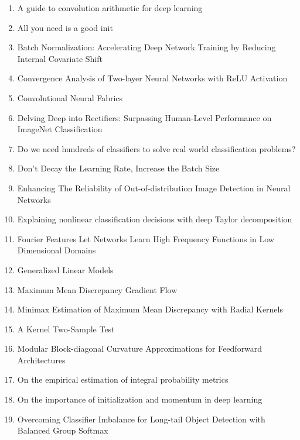 \documentclass[acmlarge]{acmart}
\begin{document}
\begin{enumerate}
	\item A guide to convolution arithmetic for deep learning \cite{Dumoulin2016AGT}
	\item All you need is a good init \cite{Mishkin2016AllYN}
	\item Batch Normalization: Accelerating Deep Network Training by Reducing Internal Covariate Shift \cite{Ioffe2015BatchNA}
	\item Convergence Analysis of Two-layer Neural Networks with ReLU Activation \cite{Li2017ConvergenceAO}
	\item Convolutional Neural Fabrics \cite{Saxena2016ConvolutionalNF}
	\item Delving Deep into Rectifiers: Surpassing Human-Level Performance on ImageNet Classification \cite{He2015DelvingDI}
	\item Do we need hundreds of classifiers to solve real world classification problems? \cite{Delgado2014DoWN}
	\item Don't Decay the Learning Rate, Increase the Batch Size \cite{Smith2018DontDT}
	\item Enhancing The Reliability of Out-of-distribution Image Detection in Neural Networks \cite{Liang2018EnhancingTR}
	\item Explaining nonlinear classification decisions with deep Taylor decomposition \cite{Montavon2017ExplainingNC}
	\item Fourier Features Let Networks Learn High Frequency Functions in Low Dimensional Domains \cite{Tancik2020FourierFL}
	\item Generalized Linear Models \cite{McCullagh1972GeneralizedLM}
	\item Maximum Mean Discrepancy Gradient Flow \cite{Arbel2019MaximumMD}
	\item Minimax Estimation of Maximum Mean Discrepancy with Radial Kernels \cite{Tolstikhin2016MinimaxEO}
	\item A Kernel Two-Sample Test \cite{Gretton2012AKT}
	\item Modular Block-diagonal Curvature Approximations for Feedforward Architectures \cite{Dangel2020ModularBC}
	\item On the empirical estimation of integral probability metrics \cite{Sriperumbudur2012OnTE}
	\item On the importance of initialization and momentum in deep learning \cite{Sutskever2013OnTI}
	\item Overcoming Classifier Imbalance for Long-tail Object Detection with Balanced Group Softmax \cite{Li2020OvercomingCI}

\end{enumerate}
\end{document}

